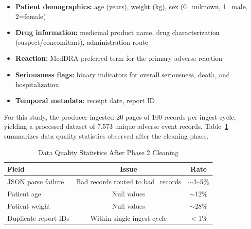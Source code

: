 \documentclass[conference]{IEEEtran}
\begin{document}
\begin{itemize}
    \item \textbf{Patient demographics:} age (years), weight (kg), sex (0=unknown, 1=male, 2=female)
    \item \textbf{Drug information:} medicinal product name, drug characterization (suspect/concomitant), administration route
    \item \textbf{Reaction:} MedDRA preferred term for the primary adverse reaction
    \item \textbf{Seriousness flags:} binary indicators for overall seriousness, death, and hospitalization
    \item \textbf{Temporal metadata:} receipt date, report ID
\end{itemize}

For this study, the producer ingested 20 pages of 100 records per ingest cycle, yielding a processed dataset of 7,573 unique adverse event records. Table~\ref{tab:data_quality} summarizes data quality statistics observed after the cleaning phase.

\begin{table}[htbp]
\caption{Data Quality Statistics After Phase 2 Cleaning}
\label{tab:data_quality}
\centering
\begin{tabular}{lcc}
\toprule
\textbf{Field} & \textbf{Issue} & \textbf{Rate} \\
\midrule
JSON parse failure     & Bad records routed to bad\_records & $\sim$3--5\% \\
Patient age            & Null values                         & $\sim$12\%   \\
Patient weight         & Null values                         & $\sim$28\%   \\
Duplicate report IDs   & Within single ingest cycle          & $<1\%$       \\
\bottomrule
\end{tabular}
\end{table}
\end{document}
